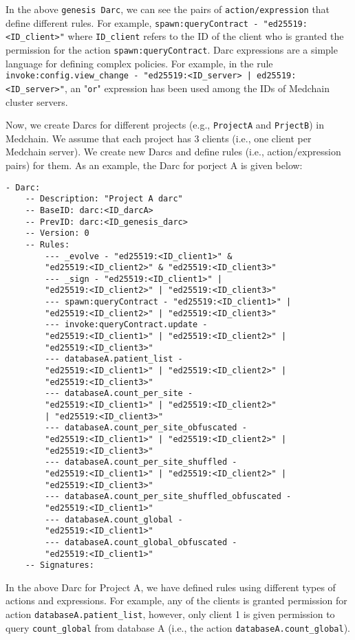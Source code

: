 In the above \texttt{genesis Darc}, we can see the pairs of \texttt{action/expression} that define different rules. For example, \texttt{spawn:queryContract - "ed25519:<ID\_client>"} where \texttt{ID\_client} refers to the ID of the client who is granted the permission for the action \texttt{spawn:queryContract}. Darc expressions are a simple language for defining complex policies. For example, in the rule \texttt{invoke:config.view\_change - "ed25519:<ID\_server> | ed25519:<ID\_server>"}, an "\texttt{or}" expression has been used among the IDs of Medchain cluster servers. 

Now, we create Darcs for different projects (e.g., \texttt{ProjectA} and \texttt{PrjectB}) in Medchain. We assume that each project has 3 clients (i.e., one client per Medchain server). We create new Darcs and define rules (i.e., action/expression pairs) for them. As an example, the Darc for porject A is given below:

\begin{verbatim}
- Darc:
    -- Description: "Project A darc"
    -- BaseID: darc:<ID_darcA>
    -- PrevID: darc:<ID_genesis_darc>
    -- Version: 0
    -- Rules:
        --- _evolve - "ed25519:<ID_client1>" & 
        "ed25519:<ID_client2>" & "ed25519:<ID_client3>"
        --- _sign - "ed25519:<ID_client1>" | 
        "ed25519:<ID_client2>" | "ed25519:<ID_client3>"
        --- spawn:queryContract - "ed25519:<ID_client1>" | 
        "ed25519:<ID_client2>" | "ed25519:<ID_client3>"
        --- invoke:queryContract.update - 
        "ed25519:<ID_client1>" | "ed25519:<ID_client2>" |
        "ed25519:<ID_client3>"
        --- databaseA.patient_list - 
        "ed25519:<ID_client1>" | "ed25519:<ID_client2>" |
        "ed25519:<ID_client3>"
        --- databaseA.count_per_site - 
        "ed25519:<ID_client1>" | "ed25519:<ID_client2>" 
        | "ed25519:<ID_client3>"
        --- databaseA.count_per_site_obfuscated - 
        "ed25519:<ID_client1>" | "ed25519:<ID_client2>" | 
        "ed25519:<ID_client3>"
        --- databaseA.count_per_site_shuffled - 
        "ed25519:<ID_client1>" | "ed25519:<ID_client2>" |
        "ed25519:<ID_client3>"
        --- databaseA.count_per_site_shuffled_obfuscated - 
        "ed25519:<ID_client1>" 
        --- databaseA.count_global - 
        "ed25519:<ID_client1>" 
        --- databaseA.count_global_obfuscated - 
        "ed25519:<ID_client1>" 
    -- Signatures:
\end{verbatim}

In the above Darc for Project A, we have defined rules using different types of actions and expressions. For example, any of the clients is granted permission for action \texttt{databaseA.patient\_list}, however, only client 1 is given permission to query \texttt{count\_global} from database A (i.e., the action \texttt{databaseA.count\_global}). 

